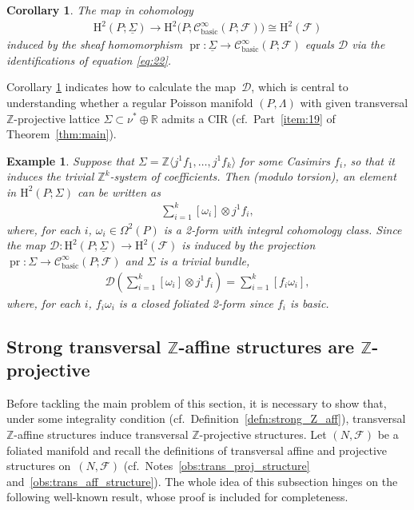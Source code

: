 \documentclass[pdftex]{sigma}
\numberwithin{equation}{section}
\newtheorem{Corollary}[Theorem]{Corollary}
\newtheorem{Example}[Theorem]{Example}
\newcommand{\pr}{\operatorname{pr}}
\newcommand{\PM}{(P,\Lambda)} %
\newcommand{\HH}{\mathrm{H}}
\newcommand{\RR}{\mathbb{R}}
\newcommand{\ZZ}{\mathbb{Z}}
\begin{document}
\begin{Corollary}\label{cor:po}
 The map in cohomology
 \begin{gather*}
 \HH^2(P;\underline{\Sigma}) \to \HH^2\big(P;\mathcal{C}^{\infty}_{\mathrm{basic}}(P;\mathcal{F})\big) \cong \HH^2(\mathcal{F})
 \end{gather*}
induced by the sheaf homomorphism $\pr \colon \underline{\Sigma} \to \mathcal{C}^{\infty}_{\mathrm{basic}}(P;\mathcal{F})$ equals $\mathcal{D}$ via the identifications of equation \eqref{eq:22}.
\end{Corollary}

Corollary \ref{cor:po} indicates how to calculate the map~$\mathcal{D}$, which is central to understanding whether a regular Poisson manifold $\PM$ with given transversal $\ZZ$-projective lattice $\Sigma \subset \nu^* \oplus \RR$ admits a CIR (cf.\ Part~\ref{item:19} of Theorem~\ref{thm:main}).

\begin{Example} \label{exm:trivial_tips}
Suppose that $\Sigma = \ZZ \langle j^1 f_1 ,\ldots, j^1 f_k \rangle$ for some Casimirs $f_i$, so that it induces the trivial $\ZZ^k$-system of coef\/f\/icients. Then (modulo torsion), an element in $\HH^2(P;\Sigma)$ can be written as
 \begin{gather*}
 \sum\limits_{i=1}^k [\omega_i] \otimes j^1 f_i,
 \end{gather*}
where, for each $i$, $\omega_i \in \Omega^2(P)$ is a 2-form with integral cohomology class. Since the map $\mathcal{D} \colon \HH^2(P;\underline{\Sigma}) \to \HH^2(\mathcal{F})$ is induced by the projection $\pr \colon \Sigma \to \mathcal{C}^{\infty}_{\mathrm{basic}}(P;\mathcal{F})$ and $\Sigma$ is a trivial bundle,
\begin{gather*}
 \mathcal{D} \left(\sum\limits_{i=1}^k [\omega_i] \otimes j^1 f_i\right) = \sum\limits_{i=1}^k [f_i \omega_i],
 \end{gather*}
where, for each $i$, $f_i\omega_i$ is a closed foliated 2-form since $f_i$ is basic.
\end{Example}

\subsection{Strong transversal $\ZZ$-af\/f\/ine structures are $\ZZ$-projective}\label{sec:strong-transv-zz}
Before tackling the main problem of this section, it is necessary to show that, under some integrality condition (cf.\ Def\/inition~\ref{defn:strong_Z_aff}), transversal $\ZZ$-af\/f\/ine structures induce transversal $\ZZ$-projective structures. Let $(N,\mathcal{F})$ be a foliated manifold and recall the def\/initions of transversal af\/f\/ine and projective structures on~$(N,\mathcal{F})$ (cf.\ Notes~\ref{obs:trans_proj_structure} and~\ref{obs:trans_aff_structure}). The whole idea of this subsection hinges on the following well-known result, whose proof is included for completeness.
\end{document}
